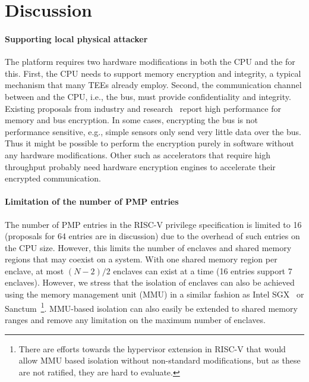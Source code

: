 \section{Discussion}
\label{sec:discussion}

\setcounter{para}{0}


\paragraph{Supporting local physical attacker} The platform requires two hardware modifications in both the CPU and the \sphw for this. First, the CPU needs to support memory encryption and integrity, a typical mechanism that many TEEs already employ. Second, the communication channel between \sphw and the CPU, i.e., the bus, must provide confidentiality and integrity. Existing proposals from industry and research~\cite{gueron2016memoryencrpytion,kaplan2016amdmemencryption,suh2003aegis} report high performance for memory and bus encryption. In some cases, encrypting the bus is not performance sensitive, e.g., simple sensors only send very little data over the bus. Thus it might be possible to perform the encryption purely in software without any hardware modifications. Other \sphw such as accelerators that require high throughput probably need hardware encryption engines to accelerate their encrypted communication.



\paragraph{Limitation of the number of PMP entries} The number of PMP entries in the RISC-V privilege specification is limited to 16 (proposals for 64 entries are in discussion) due to the overhead of such entries on the CPU size. However, this limits the number of enclaves and shared memory regions that may coexist on a system. With one shared memory region per enclave, at most $(N-2)/2$ enclaves can exist at a time (16 entries support 7 enclaves). However, we stress that the isolation of enclaves can also be achieved using the memory management unit (MMU) in a similar fashion as Intel SGX~\cite{costan2016intel} or Sanctum~\cite{costan2016sanctum}\footnote{There are efforts towards the hypervisor extension in RISC-V that would allow MMU based isolation without non-standard modifications, but as these are not ratified, they are hard to evaluate.}. MMU-based isolation can also easily be extended to shared memory ranges and remove any limitation on the maximum number of enclaves. 


